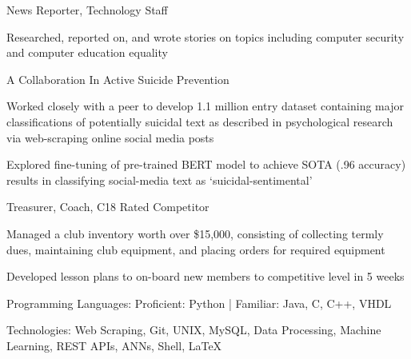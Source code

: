 \documentclass{vivek-resume}
\begin{document}
	\begin{position}{News Reporter, Technology Staff}{}
		\item Researched, reported on, and wrote stories on topics including computer security and computer education equality
	\end{position}

	\begin{position}{A Collaboration In Active Suicide Prevention}{}
	\item Worked closely with a peer to develop 1.1 million entry dataset containing major classifications of potentially suicidal text as described in psychological research via web-scraping online social media posts
	\item Explored fine-tuning of pre-trained BERT model to achieve SOTA (.96 accuracy) results in classifying social-media text as ‘suicidal-sentimental’
	\end{position}

	\begin{position}{Treasurer, Coach, C18  Rated Competitor}{}
	\item Managed a club inventory worth over \$15,000, consisting of collecting termly dues, maintaining club equipment, and placing orders for required equipment
	\item Developed lesson plans to on-board new members to competitive level in 5 weeks
	\end{position}

\vspace{-1em}
	Programming Languages: Proficient: Python | Familiar: Java, C, C++, VHDL
	
	Technologies: Web Scraping, Git, UNIX, MySQL, Data Processing, Machine Learning, REST APIs, ANNs, Shell, \LaTeX
\end{document}

